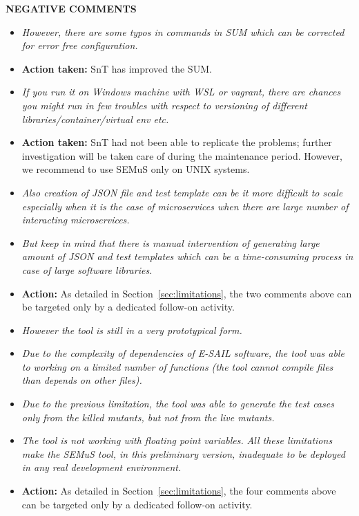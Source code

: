 \textbf{NEGATIVE  COMMENTS}
\begin{itemize}
  \item \emph{However, there are some typos in commands in SUM which can be corrected for error free configuration.}

  \item \textbf{Action taken:} SnT has improved the SUM.

  \item \emph{If you run it on Windows machine with WSL or vagrant, there are chances you might run in few troubles with respect to versioning of different libraries/container/virtual env etc.}

  \item \textbf{Action taken:} SnT had not been able to replicate the problems; further investigation will be taken care of during the maintenance period. However, we recommend to use SEMuS only on UNIX systems.

  \item \emph{Also creation of JSON file and test template can be it more difficult to scale especially when it is the case of microservices when there are large number of interacting microservices.}

  \item \emph{But keep in mind that there is manual intervention of generating large amount of JSON and test templates which can be a time-consuming process in case of large software libraries.}

  \item \textbf{Action:} As detailed in Section~\ref{sec:limitations}, the two comments above can be targeted only by a dedicated follow-on activity.

  \item \emph{However the tool is still in a very prototypical form.}

  \item \emph{Due to the complexity of dependencies of E-SAIL software, the tool was able to working on a limited number of functions (the tool cannot compile files than depends on other files).}

  \item \emph{Due to the previous limitation, the tool was able to generate the test cases only from the killed mutants, but not from the live mutants.}

  \item \emph{The tool is not working with floating point variables.}
  \emph{All these limitations make the SEMuS tool, in this preliminary version, inadequate to be deployed in any real development environment. }

  \item \textbf{Action:} As detailed in Section~\ref{sec:limitations}, the four comments above can be targeted only by a dedicated follow-on activity.

\end{itemize}

\ENDCHANGEDWPT
